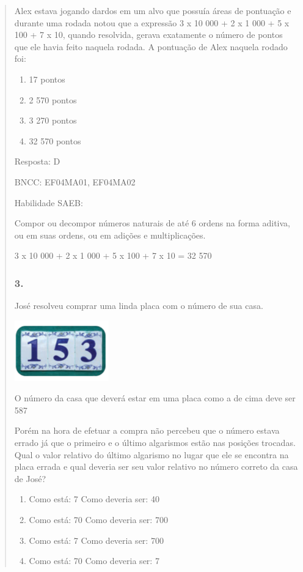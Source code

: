 \begin{enumerate}
\begin{escolha}
\begin{enumerate}
\begin{itemize}
\begin{itemize}
\begin{escolha}
\begin{quote}
\begin{escolha}
{Alex estava jogando dardos em um alvo que possuía áreas de pontuação e
durante uma rodada notou que a expressão 3 x 10 000 + 2 x 1 000 + 5 x
100 + 7 x 10, quando resolvida, gerava exatamente o número de pontos que
ele havia feito naquela rodada. A pontuação de Alex naquela rodado foi:

\begin{enumerate}
\def\labelenumi{\alph{enumi})}
\item
  17 pontos
\item
  2 570 pontos
\item
  3 270 pontos
\item
  32 570 pontos
\end{enumerate}

Resposta: D

BNCC: EF04MA01, EF04MA02

Habilidade SAEB:

Compor ou decompor números naturais de até 6 ordens na forma aditiva, ou
em suas ordens, ou em adições e multiplicações.

3 x 10 000 + 2 x 1 000 + 5 x 100 + 7 x 10 = 32 570

\subsubsection{3.}\label{section-145}

José resolveu comprar uma linda placa com o número de sua casa.

\includegraphics[width=1.60256in,height=1.03072in]{media/image143.png}

O número da casa que deverá estar em uma placa como a de cima deve ser
587

Porém na hora de efetuar a compra não percebeu que o número estava
errado já que o primeiro e o último algarismos estão nas posições
trocadas. Qual o valor relativo do último algarismo no lugar que ele se
encontra na placa errada e qual deveria ser seu valor relativo no número
correto da casa de José?

\begin{enumerate}
\def\labelenumi{\alph{enumi})}
\item
  Como está: 7 Como deveria ser: 40
\item
  Como está: 70 Como deveria ser: 700
\item
  Como está: 7 Como deveria ser: 700
\item
  Como está: 70 Como deveria ser: 7
\end{enumerate}

}
\end{escolha}
\end{quote}
\end{escolha}
\end{itemize}
\end{itemize}
\end{enumerate}
\end{escolha}
\end{enumerate}
